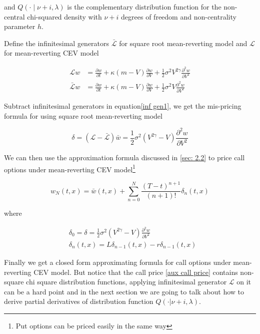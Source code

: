 \noindent and $Q(\cdot \mid \nu+i, \lambda)$ is the complementary distribution function for the non-central chi-squared density with $\nu + i$ degrees of freedom and non-centrality parameter $h$.

Define the infinitesimal generators $\bar{\mathcal{L}}$ for square root mean-reverting model and $\mathcal{L}$ for mean-reverting CEV model

\begin{equation}\label{inf gen1}
    \begin{aligned}
        \mathcal{L} w&= \frac{\partial w}{\partial t}+\kappa(m - V) \frac{\partial w}{\partial V}+\frac{1}{2} \sigma^{2} V^{2\gamma} \frac{\partial^{2} w}{\partial V^{2}} \\
        \bar{\mathcal{L}} w &= \frac{\partial w}{\partial t}+\kappa(m - V) \frac{\partial w}{\partial V}+\frac{1}{2} \sigma^{2} V \frac{\partial^{2} w}{\partial V^{2}}
    \end{aligned}
\end{equation}

Subtract infinitesimal generators in equation\eqref{inf gen1}, we get the mis-pricing formula for using square root mean-reverting model

$$
\delta = (\mathcal{L} - \bar{\mathcal{L}}) \bar{w} = \frac{1}{2} \sigma^{2} (V^{2\gamma} - V) \frac{\partial^{2} w}{\partial V^{2}}
$$

\noindent We can then use the approximation formula discussed in \ref{sec: 2.2} to price call options under mean-reverting CEV model\footnote{Put options can be priced easily in the same way}

\begin{equation} \label{cev approx formula}
    w_{N}(t, x)=\bar{w}(t,x)+\sum_{n=0}^{N} \frac{(T-t)^{n+1}}{(n+1) !} \delta_{n}(t, x)
\end{equation}

\noindent where

\begin{equation}\label{mispricing}
    \begin{aligned}
        &\delta_0 = \delta = \frac{1}{2} \sigma^{2} (V^{2\gamma} - V) \frac{\partial^{2} w}{\partial V^{2}} \\
        &\delta_{n}(t, x)=L \delta_{n-1}(t, x)- r\delta_{n-1}(t, x)
        \end{aligned}
\end{equation}

Finally we get a closed form approximating formula for call options under mean-reverting CEV model. But notice that the call price \eqref{aux call price} contains non-square chi square distribution functions, applying infinitesimal generator $\mathcal{L}$ on it can be a hard point and in the next section we are going to talk about how to derive partial derivatives of distribution function $Q(\cdot | \nu+i, \lambda)$.

